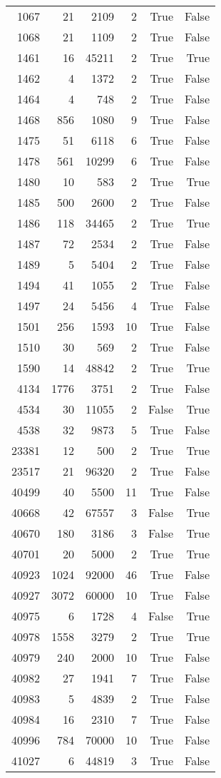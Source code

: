 \begin{tabular}{rrrrrr}
1067 & 21 & 2109 & 2 & True & False \\
1068 & 21 & 1109 & 2 & True & False \\
1461 & 16 & 45211 & 2 & True & True \\
1462 & 4 & 1372 & 2 & True & False \\
1464 & 4 & 748 & 2 & True & False \\
1468 & 856 & 1080 & 9 & True & False \\
1475 & 51 & 6118 & 6 & True & False \\
1478 & 561 & 10299 & 6 & True & False \\
1480 & 10 & 583 & 2 & True & True \\
1485 & 500 & 2600 & 2 & True & False \\
1486 & 118 & 34465 & 2 & True & True \\
1487 & 72 & 2534 & 2 & True & False \\
1489 & 5 & 5404 & 2 & True & False \\
1494 & 41 & 1055 & 2 & True & False \\
1497 & 24 & 5456 & 4 & True & False \\
1501 & 256 & 1593 & 10 & True & False \\
1510 & 30 & 569 & 2 & True & False \\
1590 & 14 & 48842 & 2 & True & True \\
4134 & 1776 & 3751 & 2 & True & False \\
4534 & 30 & 11055 & 2 & False & True \\
4538 & 32 & 9873 & 5 & True & False \\
23381 & 12 & 500 & 2 & True & True \\
23517 & 21 & 96320 & 2 & True & False \\
40499 & 40 & 5500 & 11 & True & False \\
40668 & 42 & 67557 & 3 & False & True \\
40670 & 180 & 3186 & 3 & False & True \\
40701 & 20 & 5000 & 2 & True & True \\
40923 & 1024 & 92000 & 46 & True & False \\
40927 & 3072 & 60000 & 10 & True & False \\
40975 & 6 & 1728 & 4 & False & True \\
40978 & 1558 & 3279 & 2 & True & True \\
40979 & 240 & 2000 & 10 & True & False \\
40982 & 27 & 1941 & 7 & True & False \\
40983 & 5 & 4839 & 2 & True & False \\
40984 & 16 & 2310 & 7 & True & False \\
40996 & 784 & 70000 & 10 & True & False \\
41027 & 6 & 44819 & 3 & True & False \\
\bottomrule
\end{tabular}
